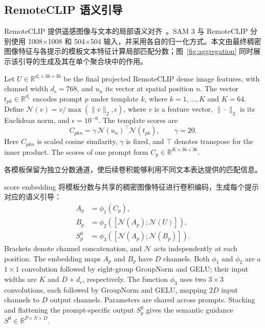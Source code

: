 \subsection{RemoteCLIP 语义引导}
RemoteCLIP 提供遥感图像与文本的局部语义对齐~\cite{liuRemoteCLIPVisionLanguage2024}。SAM 3 与 RemoteCLIP 分别使用 1008×1008 和 504×504 输入，并采用各自的归一化方式。本文由最终稠密图像特征与各提示的模板文本特征计算局部匹配分数；图~\ref{fig:aggregation} 同时展示该引导的生成及其在单个聚合块中的作用。

Let $U\in\mathbb R^{d_c\times36\times36}$ be the final projected RemoteCLIP dense image features, with channel width $d_c=768$, and $u_n$ its vector at spatial position $n$. The vector $t_{pk}\in\mathbb R^{d_c}$ encodes prompt $p$ under template $k$, where $k=1,\ldots,K$ and $K=64$. Define $\mathcal N(v)=v/\max(\|v\|_2,\epsilon)$, where $v$ is a feature vector, $\|\cdot\|_2$ is its Euclidean norm, and $\epsilon=10^{-6}$. The template scores are
\begin{equation}
 C_{pkn}=\gamma\,\mathcal N(u_n)^\top\mathcal N(t_{pk}),
 \qquad \gamma=20.
 \label{eq:template_scores}
\end{equation}
Here $C_{pkn}$ is scaled cosine similarity, $\gamma$ is fixed, and $\top$ denotes transpose for the inner product. The scores of one prompt form $C_p\in\mathbb R^{K\times36\times36}$.

各模板保留为独立分数通道，使后续卷积能够利用不同文本表达提供的匹配信息。

score embedding 将模板分数与共享的稠密图像特征进行卷积编码，生成每个提示对应的语义引导：
\begin{equation}
\begin{aligned}
 A_p &= \phi_1(C_p),\\
 B_p &= \phi_2([\mathcal N(A_p);\mathcal N(U)]),\\
 S_p^0 &= \phi_3([\mathcal N(A_p);\mathcal N(B_p)]).
\end{aligned}
\label{eq:semantic_embedding}
\end{equation}
Brackets denote channel concatenation, and $\mathcal N$ acts independently at each position. The embedding maps $A_p$ and $B_p$ have $D$ channels. Both $\phi_1$ and $\phi_2$ are a $1\times1$ convolution followed by eight-group GroupNorm and GELU; their input widths are $K$ and $D+d_c$, respectively. The function $\phi_3$ uses two $3\times3$ convolutions, each followed by GroupNorm and GELU, mapping $2D$ input channels to $D$ output channels. Parameters are shared across prompts. Stacking and flattening the prompt-specific output $S_p^0$ gives the semantic guidance $S^0\in\mathbb R^{P\times N\times D}$.

